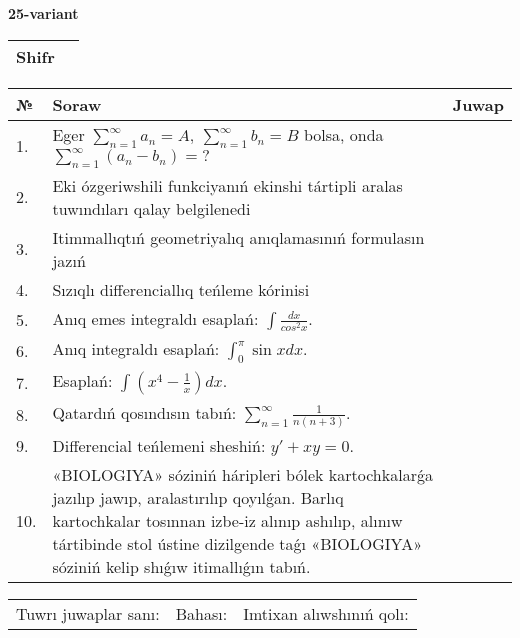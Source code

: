 \documentclass{article}
\begin{document}
  \egroup
  
  \newpage
  
  
  \textbf{25-variant}\\
  
  \bgroup
  \def\arraystretch{1.6} %
  
  \begin{tabular}{|m{5.7cm}|m{9.5cm}|}
  \hline
  Shifr & \\
  \hline
  \end{tabular}
  
  \vspace{1cm}
  
  \begin{tabular}{|m{0.7cm}|m{10cm}|m{4cm}|}
  \hline
  № & Soraw & Juwap \\
  \hline
  1. & Eger \(\sum_{n = 1}^{\infty}a_{n} = A,\ \sum_{n = 1}^{\infty}b_{n} = B\) bolsa, onda \(\sum_{n = 1}^{\infty}\left( a_{n} - b_{n} \right) = ?\) &  \\
  \hline
  2. & Eki ózgeriwshili funkciyanıń ekinshi tártipli aralas tuwındıları qalay belgilenedi &  \\
  \hline
  3. & Itimmallıqtıń geometriyalıq anıqlamasınıń formulasın jazıń &  \\
  \hline
  4. & Sızıqlı differenciallıq teńleme kórinisi &  \\
  \hline
  5. & Anıq emes integraldı esaplań: \(\int\frac{dx}{cos^2 x}\). &  \\
  \hline
  6. & Anıq integraldı esaplań: \(\int_{0}^{\pi}{\sin xdx}\). &  \\
  \hline
  7. & Esaplań: \(\int\left( x^{4} - \frac{1}{x} \right)dx\). &  \\
  \hline
  8. & Qatardıń qosındısın tabıń: \(\sum_{n = 1}^{\infty}\frac{1}{n(n + 3)}\). &  \\
  \hline
  9. & Differencial teńlemeni sheshiń: \(y' + xy = 0\). &  \\
  \hline
  10. & «BIOLOGIYA» sóziniń háripleri bólek kartochkalarǵa jazılıp jawıp, aralastırılıp qoyılǵan. Barlıq kartochkalar tosınnan izbe-iz alınıp ashılıp, alınıw tártibinde stol ústine dizilgende taǵı «BIOLOGIYA» sóziniń kelip shıǵıw itimallıǵın tabıń. &  \\
  \hline
  \end{tabular}
  
  \vspace{1cm}
  
  \begin{tabular}{lll}
  Tuwrı juwaplar sanı: \underline{\hspace{1.5cm}} & 
  Bahası: \underline{\hspace{1.5cm}} & 
  Imtixan alıwshınıń qolı: \underline{\hspace{2cm}} \\
  \end{tabular}
  
\end{document}
